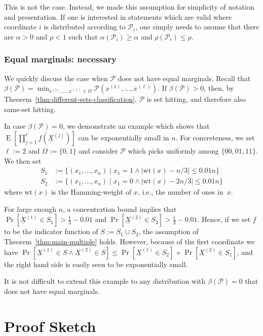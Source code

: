 \documentclass{daj}
\newcommand{\1}{\mathbbm{1}}
\theoremstyle{plain}
\theoremstyle{definition}
\DeclareMathOperator*{\EE}{E}
\newcommand{\cP}{\mathcal{P}}
\begin{document}
This is not the case.
Instead, we made this assumption for simplicity of notation and presentation.
If one is interested in statements which are valid where coordinate
$i$ is distributed according to $\mathcal{P}_i$, one simply needs
to assume that there are  $\alpha > 0$ and $\rho < 1$ such 
that
$\alpha(\mathcal{P}_i) \geq \alpha$ and $\rho(\mathcal{P}_i) \leq \rho$.


\subsubsection{Equal marginals: necessary}
\label{sec:differentMarginals}

We quickly discuss the case when $\cP$ does not have equal marginals.
Recall that $\beta(\cP) = \min_{x^{(1)}, \ldots, x^{(\ell)} \in \Omega} 
\cP(x^{(1)}, \ldots, x^{(\ell)})$. If $\beta(\cP) > 0$, then,
by Theorem~\ref{thm:different-sets-classification}, $\cP$ is set hitting,
and therefore also same-set hitting.

In case $\beta(\cP) = 0$, we demonstrate an example which shows that 
$\EE\left[\prod_{j=1}^\ell f(\underline{X}^{(j)}) \right]$ 
can be exponentially small in $n$. 
For concreteness, we set $\ell := 2$ and $\Omega := \{0,1\}$ 
and consider $\mathcal{P}$ which picks uniformly
among $\{00, 01, 11\}$.
We then set \newcommand{\wt}{\mathrm{wt}}
\begin{align}
S_1 &:= \{(x_1,\ldots,x_n) \mid x_1 = 1 \land 
|\wt(x) - n/3| \leq 0.01n\}\\
S_2 &:= \{(x_1,\ldots,x_n) \mid x_1 = 0 \land 
|\wt(x) - 2n/3| \leq 0.01n\}
\end{align}
where $\wt(x)$ is the Hamming-weight of $x$, i.e., the number of ones
in~$x$.

For large enough $n$, a concentration bound 
implies that $\Pr[\underline{X}^{(1)} \in S_1] > \frac{1}{3}-0.01$ 
and $\Pr[\underline{X}^{(2)} \in S_2] > \frac{1}{3}-0.01$.
Hence, if we set $f$ to be the indicator function of $S := S_1 \cup S_2$, 
the assumption of Theorem~\ref{thm:main-multiple} holds.
However, because of the first coordinate we have
$\Pr[\underline{X}^{(1)} \in S \land \underline{X}^{(2)} \in S]
\leq \Pr[\underline{X}^{(1)} \in S_2] + \Pr[\underline{X}^{(2)} \in S_1]$,
and the right hand side is easily seen to be exponentially
small.

It is not difficult to extend this example to any distribution 
with $\beta(\cP) = 0$ that does not
have equal marginals.

\section{Proof Sketch}
\label{sec:proof-sketch}
\end{document}
